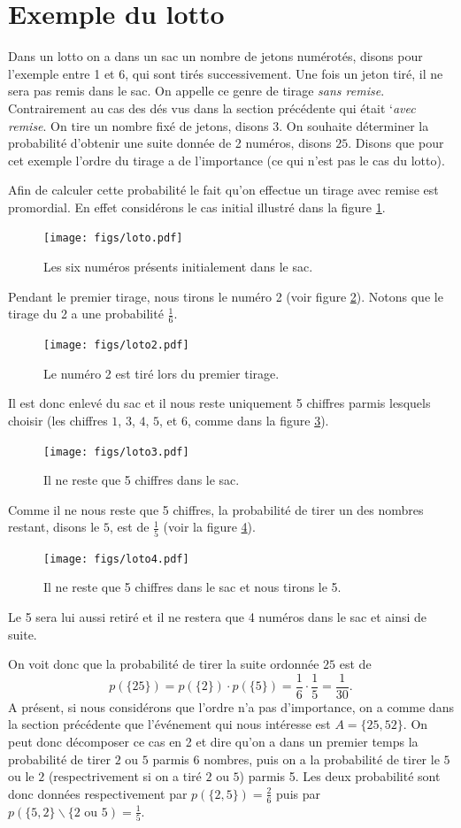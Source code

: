 \documentclass[a4paper,12pt]{book}
\begin{document}
\section{Exemple du lotto}
Dans un lotto on a dans un sac un nombre de jetons numérotés, disons pour l'exemple entre 1 et 6, 
qui sont tirés successivement. Une fois un jeton tiré, il ne sera pas remis dans le sac. 
On appelle ce genre de tirage \textit{sans remise}. Contrairement au cas des dés vus dans 
la section précédente qui était `\textit{avec remise}.
On tire un nombre fixé de jetons, disons 3. On souhaite déterminer la probabilité d'obtenir
une suite donnée de 2 numéros, disons $25$. Disons que pour cet exemple l'ordre du tirage a de l'importance
(ce qui n'est pas le cas du lotto).

Afin de calculer cette probabilité le fait qu'on effectue un tirage avec remise est promordial.
En effet considérons le cas initial illustré dans la figure \ref{fig_loto}.
\begin{figure}[htp]
\texttt{[image: figs/loto.pdf]}
\caption{Les six numéros présents initialement dans le sac.}\label{fig_loto}
\end{figure}
Pendant le premier tirage, nous tirons le numéro 2 (voir figure \ref{fig_loto2}). Notons que le tirage du 2 a une probabilité $\frac{1}{6}$.
\begin{figure}[htp]
\texttt{[image: figs/loto2.pdf]}
\caption{Le numéro 2 est tiré lors du premier tirage.}\label{fig_loto2}
\end{figure}
Il est donc enlevé du sac et il nous reste uniquement 5 chiffres parmis lesquels choisir 
(les chiffres $1$, $3$, $4$, $5$, et $6$, comme dans la figure \ref{fig_loto3}).
\begin{figure}[htp]
\texttt{[image: figs/loto3.pdf]}
\caption{Il ne reste que 5 chiffres dans le sac.}\label{fig_loto3}
\end{figure}
Comme il ne nous reste que 5 chiffres, la probabilité de tirer un des nombres restant, 
disons le $5$, est de $\frac{1}{5}$ (voir la figure \ref{fig_loto4}). 
\begin{figure}[htp]
\texttt{[image: figs/loto4.pdf]}
\caption{Il ne reste que 5 chiffres dans le sac et nous tirons le 5.}\label{fig_loto4}
\end{figure}
Le 5 sera lui aussi retiré et il ne restera que 4 numéros dans le sac et ainsi de suite. 

On voit donc que la probabilité de tirer la suite ordonnée $25$ est de
\begin{equation}
 p(\{25\})=p(\{2\})\cdot p(\{5\})=\frac{1}{6}\cdot\frac{1}{5}=\frac{1}{30}.
\end{equation}
A présent, si nous considérons que l'ordre n'a pas d'importance, on a comme dans la section précédente
que l'événement qui nous intéresse est $A=\{25,52\}$. On peut donc décomposer 
ce cas en 2 et dire qu'on a dans un premier temps la probabilité de tirer $2$ ou $5$ parmis 
$6$ nombres, puis on a la probabilité de tirer le $5$ ou le $2$ (respectrivement si on a tiré $2$ ou $5$) parmis 5.
Les deux probabilité sont donc données respectivement par $p(\{2,5\})=\frac{2}{6}$ puis par $p(\{5,2\}\backslash \{2\mbox{ ou }5)=\frac{1}{5}$.
\end{document}
